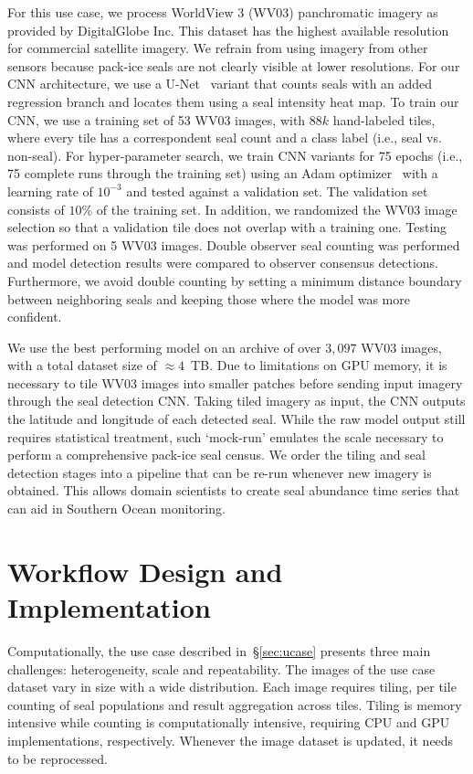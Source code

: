 For this use case, we process WorldView 3 (WV03) panchromatic imagery as provided by DigitalGlobe Inc.
This dataset has the highest available resolution for commercial satellite imagery.
We refrain from using imagery from other sensors because pack-ice seals are not clearly visible at lower resolutions.
For our CNN architecture, we use a U-Net~\cite{ronneberger2015u} variant that counts seals with an added regression branch and locates them using a seal intensity heat map.
To train our CNN, we use a training set of 53 WV03 images, with $88k$ hand-labeled tiles, where every tile has a correspondent seal count and a class label (i.e., seal vs. non-seal).
For hyper-parameter search, we train CNN variants for 75 epochs (i.e., 75 complete runs through the training set) using an Adam optimizer~\cite{kingma2014adam} with a learning rate of $10^{-3}$ and tested against a validation set.
The validation set consists of $10\%$ of the training set.
In addition, we randomized the WV03 image selection so that a validation tile does not overlap with a training one.
Testing was performed on 5 WV03 images.
Double observer seal counting was performed and model detection results were compared to observer consensus detections.
Furthermore, we avoid double counting by setting a minimum distance boundary between neighboring seals and keeping those where the model was more confident.

We use the best performing model on an archive of over $3,097$ WV03 images, with a total dataset size of $\approx4$~TB.
Due to limitations on GPU memory, it is necessary to tile WV03 images into smaller patches before sending input imagery through the seal detection CNN.
Taking tiled imagery as input, the CNN outputs the latitude and longitude of each detected seal.
While the raw model output still requires statistical treatment, such `mock-run' emulates the scale necessary to perform a comprehensive pack-ice seal census.
We order the tiling and seal detection stages into a pipeline that can be re-run whenever new imagery is obtained.
This allows domain scientists to create seal abundance time series that can aid in Southern Ocean monitoring.

\section{Workflow Design and Implementation}\label{sec:design}
Computationally, the use case described in~\S\ref{sec:ucase} presents three
main challenges: heterogeneity, scale and repeatability. The images of the
use case dataset vary in size with a wide distribution. Each image requires
tiling, per tile counting of seal populations and result aggregation across
tiles. Tiling is memory intensive while counting is computationally
intensive, requiring CPU and GPU implementations, respectively. Whenever the
image dataset is updated, it needs to be reprocessed.

